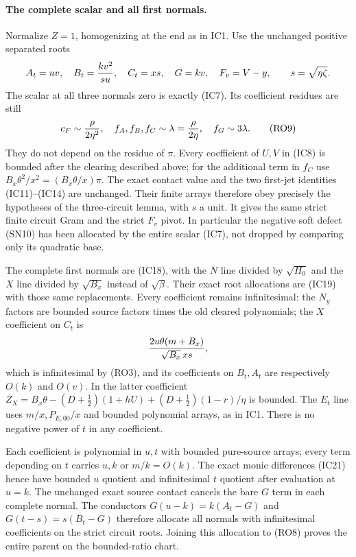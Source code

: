 \paragraph{The complete scalar and all first normals.}
Normalize $Z=1$, homogenizing at the end as in IC1. Use the unchanged
positive separated roots
\[
 A_t=uv,\quad B_t={kv^2\over s u},\quad C_t=xs,\quad
 G=kv,\quad F_v=V-y,\qquad s=\sqrt{\eta\zeta}.
\]
The scalar at all three normals zero is exactly (IC7). Its coefficient
residues are still
\[
 c_F\sim{\rho\over2\eta^2},\quad
 f_A,f_B,f_C\sim\lambda={\rho\over2\eta},\quad
 f_G\sim3\lambda.                                   \tag{RO9}
\]
They do not depend on the residue of $\pi$. Every coefficient of
$U,V$ in (IC8) is bounded after the clearing described above;
for the additional term in $f_C$ use
$B_x\theta^2/x^2=(B_x\theta/x)\pi$. The exact contact
value and the two first-jet identities (IC11)--(IC14) are unchanged.
Their finite arrays therefore obey precisely the hypotheses of the
three-circuit lemma, with $s$ a unit. It gives the same strict finite
circuit Gram and the strict $F_v$ pivot. In particular the negative
soft defect (SN10) has been allocated by the entire scalar (IC7), not
dropped by comparing only its quadratic base.

The complete first normals are (IC18), with the $N$ line divided
by $\sqrt{H_0}$ and the $X$ line divided by $\sqrt{B_x}$
instead of $\sqrt\beta$. Their exact root allocations are (IC19)
with those same replacements. Every coefficient remains infinitesimal:
the $N_y$ factors are bounded source factors times the old cleared
polynomials; the $X$ coefficient on $C_t$ is
\[
 {2u\theta(m+B_x)\over\sqrt{B_x}\,xs},
\]
which is infinitesimal by (RO3), and its coefficients on $B_t,A_t$
are respectively $O(k)$ and $O(v)$. In the latter coefficient
$Z_X=B_x\theta-(D+\tfrac12)(1+hU)
 +(D+\tfrac12)(1-r)/\eta$ is bounded. The $E_t$ line uses
$m/x,P_{E,00}/x$ and bounded polynomial arrays, as in IC1.
There is no negative power of $t$ in any coefficient.

Each coefficient is polynomial in $u,t$ with bounded pure-source
arrays; every term depending on $t$ carries $u,k$ or $m/k=O(k)$.
The exact monic differences (IC21) hence have bounded $u$ quotient
and infinitesimal $t$ quotient after evaluation at $u=k$. The
unchanged exact source contact cancels the bare $G$ term in each
complete normal. The conductors
$G(u-k)=k(A_t-G)$ and $G(t-s)=s(B_t-G)$ therefore allocate
all normals with infinitesimal coefficients on the strict circuit
roots. Joining this allocation to (RO8) proves the entire parent
on the bounded-ratio chart.

